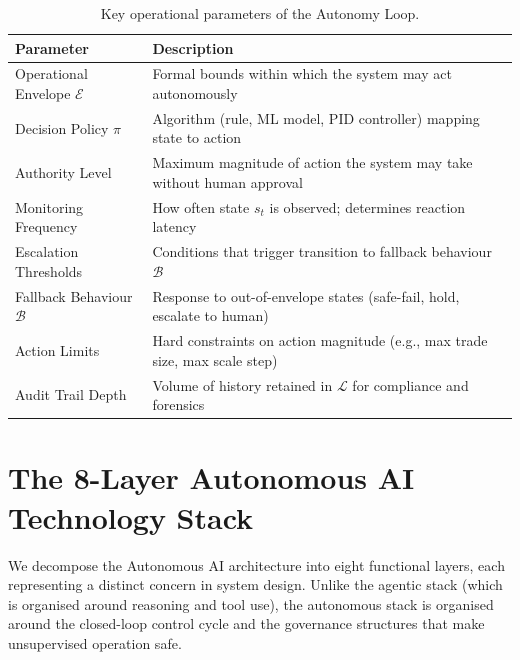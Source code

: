 \documentclass[12pt, a4paper]{article}
\begin{document}
\begin{table}[ht]
\centering
\caption{Key operational parameters of the Autonomy Loop.}
\label{tab:parameters}
\begin{tabular}{ll}
\toprule
\textbf{Parameter} & \textbf{Description} \\
\midrule
Operational Envelope $\mathcal{E}$ & Formal bounds within which the system may act autonomously \\
Decision Policy $\pi$ & Algorithm (rule, ML model, PID controller) mapping state to action \\
Authority Level & Maximum magnitude of action the system may take without human approval \\
Monitoring Frequency & How often state $s_t$ is observed; determines reaction latency \\
Escalation Thresholds & Conditions that trigger transition to fallback behaviour $\mathcal{B}$ \\
Fallback Behaviour $\mathcal{B}$ & Response to out-of-envelope states (safe-fail, hold, escalate to human) \\
Action Limits & Hard constraints on action magnitude (e.g., max trade size, max scale step) \\
Audit Trail Depth & Volume of history retained in $\mathcal{L}$ for compliance and forensics \\
\bottomrule
\end{tabular}
\end{table}

\section{The 8-Layer Autonomous AI Technology Stack}\label{sec:stack}

We decompose the Autonomous AI architecture into eight functional layers, each representing a distinct concern in system design. Unlike the agentic stack (which is organised around reasoning and tool use), the autonomous stack is organised around the closed-loop control cycle and the governance structures that make unsupervised operation safe.
\end{document}
